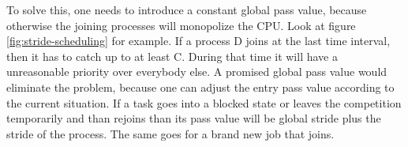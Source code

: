 To solve this, one needs to introduce a constant global pass value, because otherwise the joining processes will monopolize the CPU. 
Look at figure \ref{fig:stride-scheduling} for example.
If a process D joins at the last time interval, then it has to catch up to at least C. During that time it will have a unreasonable priority over everybody else.
A promised global pass value would eliminate the problem, because one can adjust the entry pass value according to the current situation.
If a task goes into a blocked state or leaves the competition temporarily and than rejoins than its pass value will be global stride plus the stride of the process. The same goes for a brand new job that joins.